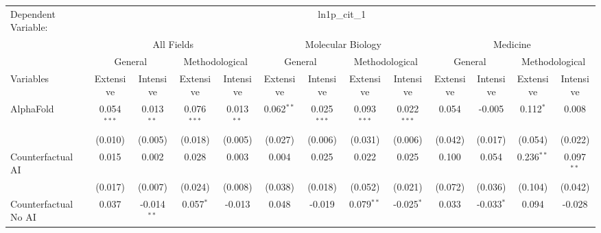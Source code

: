\begingroup
\centering
\begin{tabular}{lcccccccccccc}
   \tabularnewline \midrule \midrule
   Dependent Variable: & \multicolumn{12}{c}{ln1p\_cit\_1}\\
 & \multicolumn{4}{c}{All Fields} & \multicolumn{4}{c}{Molecular Biology} & \multicolumn{4}{c}{Medicine} \\
\cmidrule(lr){2-5} \cmidrule(lr){6-9} \cmidrule(lr){10-13}
 & \multicolumn{2}{c}{General} & \multicolumn{2}{c}{Methodological} & \multicolumn{2}{c}{General} & \multicolumn{2}{c}{Methodological} & \multicolumn{2}{c}{General} & \multicolumn{2}{c}{Methodological} \\
\cmidrule(lr){2-3} \cmidrule(lr){4-5} \cmidrule(lr){6-7} \cmidrule(lr){8-9} \cmidrule(lr){10-11} \cmidrule(lr){12-13}
Variables & \multicolumn{1}{c}{Extensive} & \multicolumn{1}{c}{Intensive} & \multicolumn{1}{c}{Extensive} & \multicolumn{1}{c}{Intensive} & \multicolumn{1}{c}{Extensive} & \multicolumn{1}{c}{Intensive} & \multicolumn{1}{c}{Extensive} & \multicolumn{1}{c}{Intensive} & \multicolumn{1}{c}{Extensive} & \multicolumn{1}{c}{Intensive} & \multicolumn{1}{c}{Extensive} & \multicolumn{1}{c}{Intensive} \\
\cmidrule(lr){1-1}\cmidrule(lr){2-2} \cmidrule(lr){3-3} \cmidrule(lr){4-4} \cmidrule(lr){5-5} \cmidrule(lr){6-6} \cmidrule(lr){7-7} \cmidrule(lr){8-8} \cmidrule(lr){9-9} \cmidrule(lr){10-10} \cmidrule(lr){11-11} \cmidrule(lr){12-12} \cmidrule(lr){13-13}
   AlphaFold                                & 0.054$^{***}$ & 0.013$^{**}$  & 0.076$^{***}$ & 0.013$^{**}$ & 0.062$^{**}$  & 0.025$^{***}$ & 0.093$^{***}$  & 0.022$^{***}$ & 0.054   & -0.005       & 0.112$^{*}$  & 0.008\\   
                                            & (0.010)       & (0.005)       & (0.018)       & (0.005)      & (0.027)       & (0.006)       & (0.031)        & (0.006)       & (0.042) & (0.017)      & (0.054)      & (0.022)\\   
   Counterfactual AI                        & 0.015         & 0.002         & 0.028         & 0.003        & 0.004         & 0.025         & 0.022          & 0.025         & 0.100   & 0.054        & 0.236$^{**}$ & 0.097$^{**}$\\   
                                            & (0.017)       & (0.007)       & (0.024)       & (0.008)      & (0.038)       & (0.018)       & (0.052)        & (0.021)       & (0.072) & (0.036)      & (0.104)      & (0.042)\\   
   Counterfactual No AI                     & 0.037         & -0.014$^{**}$ & 0.057$^{*}$   & -0.013       & 0.048         & -0.019        & 0.079$^{**}$   & -0.025$^{*}$  & 0.033   & -0.033$^{*}$ & 0.094        & -0.028\\   

\end{tabular}

